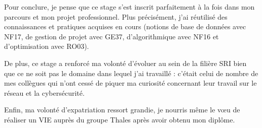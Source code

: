 
Pour conclure, je pense que ce stage s'est inscrit parfaitement à la fois dans mon parcours et mon projet professionnel.
Plus précisément, j'ai réutilisé des connaissances et pratiques acquises en cours (notions de base de données avec NF17, de gestion de projet avec GE37, d'algorithmique avec NF16 et d'optimisation avec RO03).

De plus, ce stage a renforcé ma volonté d'évoluer au sein de la filière SRI bien que ce ne soit pas le domaine dans lequel j'ai travaillé : c'était celui de nombre de mes collègues qui n'ont cessé de piquer ma curiosité concernant leur travail sur le réseau et la cybersécurité.

Enfin, ma volonté d'expatriation ressort grandie, je nourris même le vœu de réaliser un VIE auprès du groupe Thales après avoir obtenu mon diplôme.
